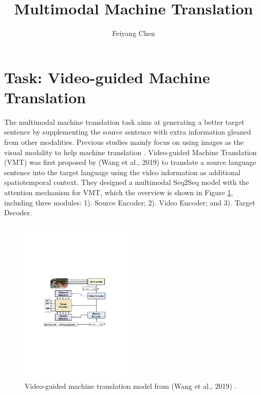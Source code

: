 \documentclass{article}
\title{Multimodal Machine Translation}
\author{Feiyang Chen}
\begin{document}
\maketitle





\section{Task: Video-guided Machine Translation}

The multimodal machine translation task aims at generating a better target sentence by supplementing the source sentence with extra information gleaned from other modalities. Previous studies mainly focus on using images as the visual modality to help machine translation \cite{specia2016shared,elliott2017findings,barrault2018findings}. Video-guided Machine Translation (VMT) was first proposed by (Wang et al., 2019) \cite{wang2019vatex} to translate a source language sentence into the target language using the video information as additional spatiotemporal context. They designed a multimodal Seq2Seq model with the attention mechanism for VMT, which the overview is shown in Figure \ref{Fig.main}, including three modules: 1). Source Encoder; 2). Video Encoder; and 3). Target Decoder. 


	\begin{figure}[htbp] 
		\centering
		\includegraphics[width=0.5\textwidth]{baseline.pdf} 
		\caption{Video-guided machine translation model from (Wang et al., 2019) \cite{wang2019vatex}.}
		\label{Fig.main} 
	\end{figure}
	
\end{document}

